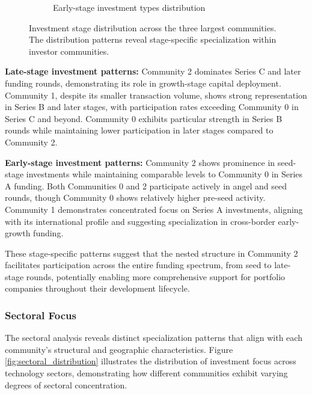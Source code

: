 \begin{figure}[htbp]
\begin{subfigure}[t]{0.48\textwidth}
    \caption{Early-stage investment types distribution}
    \label{fig:early_stage_types}
\end{subfigure}
\caption{Investment stage distribution across the three largest communities. The distribution patterns reveal stage-specific specialization within investor communities.}
\label{fig:investment_stage_distribution}
\end{figure}

\textbf{Late-stage investment patterns:} Community 2 dominates Series C and later funding rounds, demonstrating its role in growth-stage capital deployment. Community 1, despite its smaller transaction volume, shows strong representation in Series B and later stages, with participation rates exceeding Community 0 in Series C and beyond. Community 0 exhibits particular strength in Series B rounds while maintaining lower participation in later stages compared to Community 2.

\textbf{Early-stage investment patterns:} Community 2 shows prominence in seed-stage investments while maintaining comparable levels to Community 0 in Series A funding. Both Communities 0 and 2 participate actively in angel and seed rounds, though Community 0 shows relatively higher pre-seed activity. Community 1 demonstrates concentrated focus on Series A investments, aligning with its international profile and suggesting specialization in cross-border early-growth funding.

These stage-specific patterns suggest that the nested structure in Community 2 facilitates participation across the entire funding spectrum, from seed to late-stage rounds, potentially enabling more comprehensive support for portfolio companies throughout their development lifecycle.

\subsubsection{Sectoral Focus}

The sectoral analysis reveals distinct specialization patterns that align with each community's structural and geographic characteristics. Figure \ref{fig:sectoral_distribution} illustrates the distribution of investment focus across technology sectors, demonstrating how different communities exhibit varying degrees of sectoral concentration.

